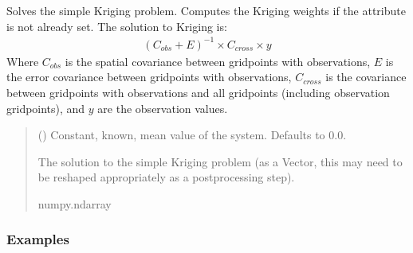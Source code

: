 \documentclass[letterpaper,10pt,english]{sphinxmanual}
\begin{document}
\begin{fulllineitems}
\begin{fulllineitems}
\label{\detokenize{kriging:glomar_gridding.kriging.SimpleKriging.solve}}
\pysigstartsignatures
\pysiglinewithargsret
{}
{}
{}
\pysigstopsignatures
\sphinxAtStartPar
Solves the simple Kriging problem. Computes the Kriging weights if the
 attribute is not already set. The solution to Kriging
is:
\begin{equation*}
\begin{split}(C_{obs} + E)^{-1} \times C_{cross} \times y\end{split}
\end{equation*}
\sphinxAtStartPar
Where \(C_{obs}\) is the spatial covariance between grid\sphinxhyphen{}points
with observations, \(E\) is the error covariance between grid\sphinxhyphen{}points
with observations, \(C_{cross}\) is the covariance between
grid\sphinxhyphen{}points with observations and all grid\sphinxhyphen{}points (including observation
grid\sphinxhyphen{}points), and \(y\) are the observation values.
\begin{quote}\begin{description}
\sphinxAtStartPar
{} (\sphinxstyleliteralemphasis{\sphinxupquote{ | }}) \textendash{} Constant, known, mean value of the system. Defaults to 0.0.

\sphinxAtStartPar
The solution to the simple Kriging problem (as a Vector, this may
need to be re\sphinxhyphen{}shaped appropriately as a post\sphinxhyphen{}processing step).

\sphinxAtStartPar
numpy.ndarray

\end{description}\end{quote}
\subsubsection*{Examples}

\begin{sphinxVerbatim}[commandchars=\\\{\}]
  
  
\end{sphinxVerbatim}

\end{fulllineitems}


\end{fulllineitems}
\end{document}
